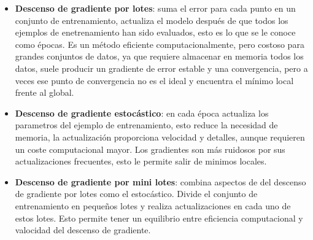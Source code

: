 \begin{itemize}
    \item \textbf{Descenso de gradiente por lotes}: suma el error para cada punto en un conjunto de entrenamiento, actualiza el modelo después de que todos los ejemplos de enetrenamiento han sido evaluados, esto es lo que se le conoce como épocas. Es un método eficiente computacionalmente, pero costoso para grandes conjuntos de datos, ya que requiere almacenar en memoria todos los datos, suele producir un gradiente de error estable y una convergencia, pero a veces ese punto de convergencia no es el ideal y encuentra el mínimo local frente al global.
    \item \textbf{Descenso de gradiente estocástico}: en cada época actualiza los parametros del ejemplo de entrenamiento, esto reduce la necesidad de memoria, la actualización proporciona velocidad y detalles, aunque requieren un coste computacional mayor. Los gradientes son más ruidosos por sus actualizaciones frecuentes, esto le permite salir de minimos locales.
    \item \textbf{Descenso de gradiente por mini lotes}: combina aspectos de del descenso de gradiente por lotes como el estocástico. Divide el conjunto de entrenamiento en pequeños lotes y realiza actualizaciones en cada uno de estos lotes. Esto permite tener un equilibrio entre eficiencia computacional y valocidad del descenso de gradiente.
\end{itemize}


